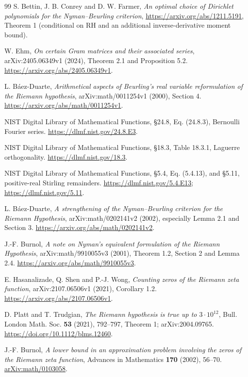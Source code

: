 \documentclass[11pt]{article}
\theoremstyle{remark}
\begin{document}
\begin{thebibliography}{99}
S. Bettin, J. B. Conrey and D. W. Farmer,
\emph{An optimal choice of Dirichlet polynomials for the Nyman--Beurling criterion},
\url{https://arxiv.org/abs/1211.5191}, Theorem 1 (conditional on RH and an
additional inverse-derivative moment bound).

W. Ehm, \emph{On certain Gram matrices and their associated series},
arXiv:2405.06349v1 (2024), Theorem 2.1 and Proposition 5.2.
\url{https://arxiv.org/abs/2405.06349v1}.

L. B\'aez-Duarte,
\emph{Arithmetical aspects of Beurling's real variable reformulation
of the Riemann hypothesis}, arXiv:math/0011254v1 (2000), Section 4.
\url{https://arxiv.org/abs/math/0011254v1}.

NIST Digital Library of Mathematical Functions,
\S24.8, Eq. (24.8.3), Bernoulli Fourier series.
\url{https://dlmf.nist.gov/24.8.E3}.

NIST Digital Library of Mathematical Functions,
\S18.3, Table 18.3.1, Laguerre orthogonality.
\url{https://dlmf.nist.gov/18.3}.

NIST Digital Library of Mathematical Functions,
\S5.4, Eq. (5.4.13), and \S5.11, positive-real Stirling remainders.
\url{https://dlmf.nist.gov/5.4.E13}; \url{https://dlmf.nist.gov/5.11}.

L. B\'aez-Duarte,
\emph{A strengthening of the Nyman--Beurling criterion for the Riemann Hypothesis},
arXiv:math/0202141v2 (2002), especially Lemma 2.1 and Section 3.
\url{https://arxiv.org/abs/math/0202141v2}.


\begingroup\raggedright
{}
J.-F. Burnol, \emph{A note on Nyman's equivalent formulation of the
Riemann Hypothesis}, arXiv:math/9910055v3 (2001),
Theorem 1.2, Section 2 and Lemma 2.4.
\url{https://arxiv.org/abs/math/9910055v3}.

E. Hasanalizade, Q. Shen and P.-J. Wong,
\emph{Counting zeros of the Riemann zeta function},
arXiv:2107.06506v1 (2021), Corollary 1.2.
\url{https://arxiv.org/abs/2107.06506v1}.

D. Platt and T. Trudgian,
\emph{The Riemann hypothesis is true up to $3\cdot10^{12}$},
Bull. London Math. Soc. \textbf{53} (2021), 792--797, Theorem 1;
arXiv:2004.09765.
\url{https://doi.org/10.1112/blms.12460}.
\par\endgroup

J.-F. Burnol,
\emph{A lower bound in an approximation problem involving the zeros of the Riemann zeta function},
Advances in Mathematics \textbf{170} (2002), 56--70.
\href{https://arxiv.org/abs/math/0103058}{arXiv:math/0103058}.

\end{thebibliography}
\end{document}
